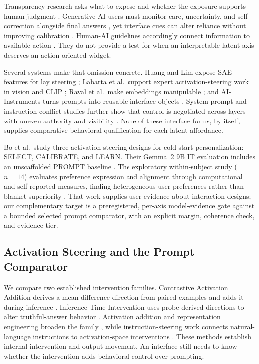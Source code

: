 \documentclass[sigconf]{acmart}
\begin{document}
Transparency research asks what to expose and whether the exposure supports human judgment \cite{liao2024transparency}. Generative-AI users must monitor care, uncertainty, and self-correction alongside final answers \cite{tankelevitch2024metacog}, yet interface cues can alter reliance without improving calibration \cite{lee2004trust,bansal2019beyond,bucinca2021trust}. Human-AI guidelines accordingly connect information to available action \cite{amershi2019guidelines}. They do not provide a test for when an interpretable latent axis deserves an action-oriented widget.

Several systems make that omission concrete. Huang and Lim expose SAE features for lay steering \cite{huang2025steering}; Labarta et al.\ support expert activation-steering work in vision and CLIP \cite{labarta2026attribution}; Raval et al.\ make embeddings manipulable \cite{raval2026latman}; and AI-Instruments turns prompts into reusable interface objects \cite{riche2025aiinstr}. System-prompt and instruction-conflict studies further show that control is negotiated across layers with uneven authority and visibility \cite{neumann2026whocontrols,he2025coninstruct}. None of these interface forms, by itself, supplies comparative behavioral qualification for each latent affordance.

Bo et al.\ study three activation-steering designs for cold-start personalization: SELECT, CALIBRATE, and LEARN. Their Gemma~2 9B IT evaluation includes an unscaffolded PROMPT baseline \cite{bo2026steerable}. The exploratory within-subject study (\(n=14\)) evaluates preference expression and alignment through computational and self-reported measures, finding heterogeneous user preferences rather than blanket superiority \cite{bo2026steerable}. That work supplies user evidence about interaction designs; our complementary target is a preregistered, per-axis model-evidence gate against a bounded selected prompt comparator, with an explicit margin, coherence check, and evidence tier.

\subsection{Activation Steering and the Prompt Comparator}

We compare two established intervention families. Contrastive Activation Addition derives a mean-difference direction from paired examples and adds it during inference \cite{rimsky2024caa}. Inference-Time Intervention uses probe-derived directions to alter truthful-answer behavior \cite{li2023iti}. Activation addition and representation engineering broaden the family \cite{turner2023actadd,zou2023repe}, while instruction-steering work connects natural-language instructions to activation-space interventions \cite{stolfo2025instr}. These methods establish internal intervention and output movement. An interface still needs to know whether the intervention adds behavioral control over prompting.
\end{document}
